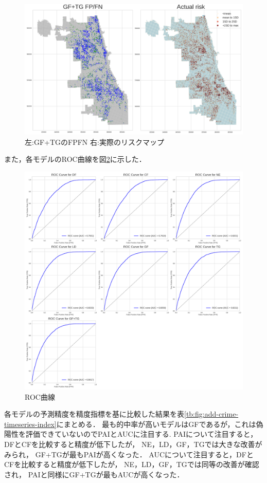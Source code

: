 \begin{figure}
  \centering %
  \includegraphics[scale=0.25]{./add-crime-timeseries-fig/GF+TG_fnp.png}
  \caption{左:GF+TGのFPFN 右:実際のリスクマップ}
  \label{fig:add-crime-timeseries-gf-tg-fnp}
\end{figure}
また，各モデルのROC曲線を図\ref{fig:add-crime-timeseries-roc}に示した．

\begin{figure}
  \centering %
  \includegraphics[scale=0.25]{./add-crime-timeseries-fig/roc_auc.png}
  \caption{ROC曲線}
  \label{fig:add-crime-timeseries-roc}
\end{figure}
各モデルの予測精度を精度指標を基に比較した結果を表\ref{tb:fig:add-crime-timeseries-index}にまとめる．
最も的中率が高いモデルはGFであるが，これは偽陽性を評価できていないのでPAIとAUCに注目する.
PAIについて注目すると，DFとCFを比較すると精度が低下したが，
NE，LD，GF，TGでは大きな改善がみられ，
GF+TGが最もPAIが高くなった．
AUCについて注目すると，DFとCFを比較すると精度が低下したが，
NE，LD，GF，TGでは同等の改善が確認され，
PAIと同様にGF+TGが最もAUCが高くなった．

